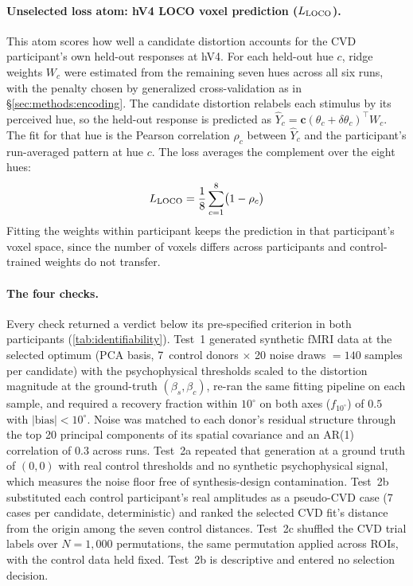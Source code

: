 \paragraph{Unselected loss atom: hV4 LOCO voxel prediction ($L_{\rm LOCO}$).}
This atom scores how well a candidate distortion accounts for the CVD participant's own held-out responses at hV4. For each held-out hue $c$, ridge weights $W_c$ were estimated from the remaining seven hues across all six runs, with the penalty chosen by generalized cross-validation as in \S\ref{sec:methods:encoding}. The candidate distortion relabels each stimulus by its perceived hue, so the held-out response is predicted as $\hat{Y}_c = \mathbf{c}(\theta_c + \delta\theta_c)^\top W_c$. The fit for that hue is the Pearson correlation $\rho_c$ between $\hat{Y}_c$ and the participant's run-averaged pattern at hue $c$. The loss averages the complement over the eight hues:
%
\begin{equation}
  L_{\rm LOCO} = \frac{1}{8}\sum_{c=1}^{8}\bigl(1 - \rho_c\bigr)
  \label{eq:lloco}
\end{equation}
%
Fitting the weights within participant keeps the prediction in that participant's voxel space, since the number of voxels differs across participants and control-trained weights do not transfer.

\paragraph{The four checks.}
Every check returned a verdict below its pre-specified criterion in both participants (\cref{tab:identifiability}). Test~1 generated synthetic fMRI data at the selected optimum (PCA basis, 7~control donors $\times$ 20 noise draws $= 140$ samples per candidate) with the psychophysical thresholds scaled to the distortion magnitude at the ground-truth $(\beta_s, \beta_c)$, re-ran the same fitting pipeline on each sample, and required a recovery fraction within $10^\circ$ on both axes ($f_{10^\circ}$) of $0.5$ with $|\text{bias}| < 10^\circ$. Noise was matched to each donor's residual structure through the top 20 principal components of its spatial covariance and an AR(1) correlation of $0.3$ across runs. Test~2a repeated that generation at a ground truth of $(0, 0)$ with real control thresholds and no synthetic psychophysical signal, which measures the noise floor free of synthesis-design contamination. Test~2b substituted each control participant's real amplitudes as a pseudo-CVD case (7 cases per candidate, deterministic) and ranked the selected CVD fit's distance from the origin among the seven control distances. Test~2c shuffled the CVD trial labels over $N = 1{,}000$ permutations, the same permutation applied across ROIs, with the control data held fixed. Test~2b is descriptive and entered no selection decision.

